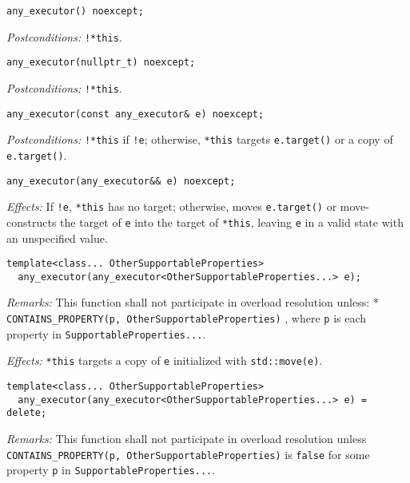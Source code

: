 \documentclass[a4paper,12pt,notitlepage,twoside,openright]{article}
\begin{document}
\begin{verbatim}
any_executor() noexcept;
\end{verbatim}

\emph{Postconditions:} \texttt{!*this}.

\begin{verbatim}
any_executor(nullptr_t) noexcept;
\end{verbatim}

\emph{Postconditions:} \texttt{!*this}.

\begin{verbatim}
any_executor(const any_executor& e) noexcept;
\end{verbatim}

\emph{Postconditions:} \texttt{!*this} if
\texttt{!e}; otherwise, \texttt{*this} targets
\texttt{e.target()} or a copy of
\texttt{e.target()}.

\begin{verbatim}
any_executor(any_executor&& e) noexcept;
\end{verbatim}

\emph{Effects:} If \texttt{!e}, \texttt{*this}
has no target; otherwise, moves \texttt{e.target()} or
move-constructs the target of \texttt{e} into the target of
\texttt{*this}, leaving \texttt{e} in a valid
state with an unspecified value.

\begin{verbatim}
template<class... OtherSupportableProperties>
  any_executor(any_executor<OtherSupportableProperties...> e);
\end{verbatim}

\emph{Remarks:} This function shall not participate in overload
resolution unless: *
\texttt{CONTAINS_PROPERTY(p, OtherSupportableProperties)} ,
where \texttt{p} is each property in
\texttt{SupportableProperties...}.

\emph{Effects:} \texttt{*this} targets a copy of
\texttt{e} initialized with
\texttt{std::move(e)}.

\begin{verbatim}
template<class... OtherSupportableProperties>
  any_executor(any_executor<OtherSupportableProperties...> e) = delete;
\end{verbatim}

\emph{Remarks:} This function shall not participate in overload
resolution unless
\texttt{CONTAINS_PROPERTY(p, OtherSupportableProperties)} is
\texttt{false} for some property \texttt{p} in
\texttt{SupportableProperties...}.
\end{document}
